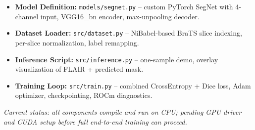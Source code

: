 \begin{itemize}
    \item \textbf{Model Definition:} \texttt{models/segnet.py} – custom PyTorch SegNet with 4-channel input, VGG16\_bn encoder, max-unpooling decoder.
    \item \textbf{Dataset Loader:} \texttt{src/dataset.py} – NiBabel-based BraTS slice indexing, per-slice normalization, label remapping.
    \item \textbf{Inference Script:} \texttt{src/inference.py} – one-sample demo, overlay visualization of FLAIR + predicted mask.
    \item \textbf{Training Loop:} \texttt{src/train.py} – combined CrossEntropy + Dice loss, Adam optimizer, checkpointing, ROCm diagnostics.
\end{itemize}

\noindent\textit{Current status: all components compile and run on CPU; pending GPU driver and CUDA setup before full end-to-end training can proceed.}